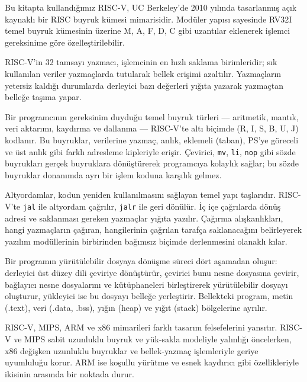 Bu kitapta kullandığımız RISC-V, UC Berkeley'de 2010 yılında tasarlanmış açık kaynaklı bir RISC buyruk kümesi mimarisidir. Modüler yapısı sayesinde RV32I temel buyruk kümesinin üzerine M, A, F, D, C gibi uzantılar eklenerek işlemci gereksinime göre özelleştirilebilir.

RISC-V'in 32 tamsayı yazmacı, işlemcinin en hızlı saklama birimleridir; sık kullanılan veriler yazmaçlarda tutularak bellek erişimi azaltılır. Yazmaçların yetersiz kaldığı durumlarda derleyici bazı değerleri yığıta yazarak yazmaçtan belleğe taşıma yapar.

Bir programcının gereksinim duyduğu temel buyruk türleri --- aritmetik, mantık, veri aktarımı, kaydırma ve dallanma --- RISC-V'te altı biçimde (R, I, S, B, U, J) kodlanır. Bu buyruklar, verilerine yazmaç, anlık, eklemeli (taban), PS'ye göreceli ve üst anlık gibi farklı adresleme kipleriyle erişir. Çevirici, \texttt{mv}, \texttt{li}, \texttt{nop} gibi sözde buyrukları gerçek buyruklara dönüştürerek programcıya kolaylık sağlar; bu sözde buyruklar donanımda ayrı bir işlem koduna karşılık gelmez.

Altyordamlar, kodun yeniden kullanılmasını sağlayan temel yapı taşlarıdır. RISC-V'te \texttt{jal} ile altyordam çağrılır, \texttt{jalr} ile geri dönülür. İç içe çağrılarda dönüş adresi ve saklanması gereken yazmaçlar yığıta yazılır. Çağırma alışkanlıkları, hangi yazmaçların çağıran, hangilerinin çağrılan tarafça saklanacağını belirleyerek yazılım modüllerinin birbirinden bağımsız biçimde derlenmesini olanaklı kılar.

Bir programın yürütülebilir dosyaya dönüşme süreci dört aşamadan oluşur: derleyici üst düzey dili çeviriye dönüştürür, çevirici bunu nesne dosyasına çevirir, bağlayıcı nesne dosyalarını ve kütüphaneleri birleştirerek yürütülebilir dosyayı oluşturur, yükleyici ise bu dosyayı belleğe yerleştirir. Bellekteki program, metin (.text), veri (.data, .bss), yığın (heap) ve yığıt (stack) bölgelerine ayrılır.

RISC-V, MIPS, ARM ve x86 mimarileri farklı tasarım felsefelerini yansıtır. RISC-V ve MIPS sabit uzunluklu buyruk ve yük-sakla modeliyle yalınlığı öncelerken, x86 değişken uzunluklu buyruklar ve bellek-yazmaç işlemleriyle geriye uyumluluğu korur. ARM ise koşullu yürütme ve esnek kaydırıcı gibi özellikleriyle ikisinin arasında bir noktada durur.

